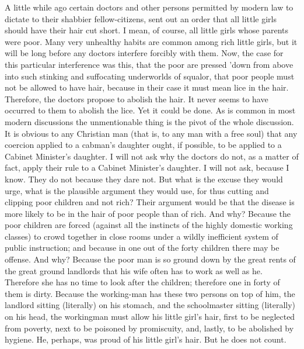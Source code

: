 \documentclass{book}
\begin{document}
A little while ago certain doctors and other persons permitted by modern law to dictate to their shabbier fellow-citizens, sent out an order that all little girls should have their hair cut short. I mean, of course, all little girls whose parents were poor. Many very unhealthy habits are common among rich little girls, but it will be long before any doctors interfere forcibly with them. Now, the case for this particular interference was this, that the poor are pressed ’down from above into such stinking and suffocating underworlds of squalor, that poor people must not be allowed to have hair, because in their case it must mean lice in the hair. Therefore, the doctors propose to abolish the hair. It never seems to have occurred to them to abolish the lice. Yet it could be done. As is common in most modern discussions the unmentionable thing is the pivot of the whole discussion. It is obvious to any Christian man (that is, to any man with a free soul) that any coercion applied to a cabman’s daughter ought, if possible, to be applied to a Cabinet Minister’s daughter. I will not ask why the doctors do not, as a matter of fact, apply their rule to a Cabinet Minister’s daughter. I will not ask, because I know. They do not because they dare not. But what is the excuse they would urge, what is the plausible argument they would use, for thus cutting and clipping poor children and not rich? Their argument would be that the disease is more likely to be in the hair of poor people than of rich. And why? Because the poor children are forced (against all the instincts of the highly domestic working classes) to crowd together in close rooms under a wildly inefficient system of public instruction; and because in one out of the forty children there may be offense. And why? Because the poor man is so ground down by the great rents of the great ground landlords that his wife often has to work as well as he. Therefore she has no time to look after the children; therefore one in forty of them is dirty. Because the working-man has these two persons on top of him, the landlord sitting (literally) on his stomach, and the schoolmaster sitting (literally) on his head, the workingman must allow his little girl’s hair, first to be neglected from poverty, next to be poisoned by promiscuity, and, lastly, to be abolished by hygiene. He, perhaps, was proud of his little girl’s hair. But he does not count.
\end{document}
